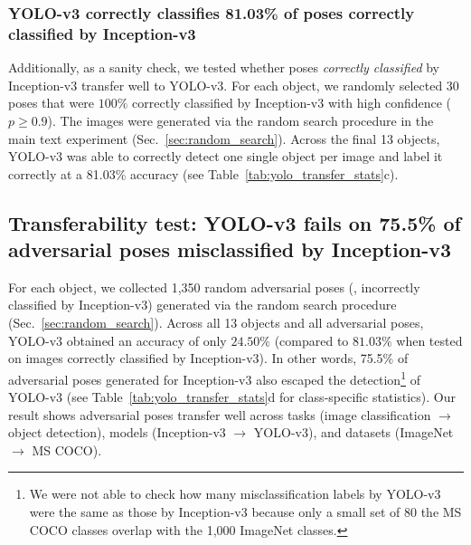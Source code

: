 \documentclass[10pt,twocolumn,letterpaper]{article}
\begin{document}
\subsubsection{YOLO-v3 correctly classifies 81.03\% of poses correctly classified by Inception-v3}

Additionally, as a sanity check, we tested whether poses \emph{correctly classified} by Inception-v3 transfer well to YOLO-v3.
For each object, we randomly selected 30 poses that were $100\%$ correctly classified by Inception-v3 with high confidence ($p \geq 0.9$).
The images were generated via the random search procedure in the main text experiment (Sec.~\ref{sec:random_search}).
Across the final 13 objects, YOLO-v3 was able to correctly detect one single object per image and label it correctly at a 81.03\% accuracy (see Table~\ref{tab:yolo_transfer_stats}c).


\subsection{Transferability test: YOLO-v3 fails on 75.5\% of adversarial poses misclassified by Inception-v3}
\label{sec:transferability}

For each object, we collected 1,350 random adversarial poses (\ie, incorrectly classified by Inception-v3) generated via the random search procedure (Sec.~\ref{sec:random_search}).
Across all 13 objects and all adversarial poses, YOLO-v3 obtained an accuracy of only $24.50\%$ (compared to $81.03\%$ when tested on images correctly classified by Inception-v3).
In other words, 75.5\% of adversarial poses generated for Inception-v3 also escaped the detection\footnote{We were not able to check how many misclassification labels by YOLO-v3 were the same as those by Inception-v3 because only a small set of 80 the MS COCO classes overlap with the 1,000 ImageNet classes.} of YOLO-v3 (see Table~\ref{tab:yolo_transfer_stats}d for class-specific statistics).
Our result shows adversarial poses transfer well across tasks (image classification $\to$ object detection), models (Inception-v3 $\to$ YOLO-v3), and datasets (ImageNet $\to$ MS COCO).
\end{document}
